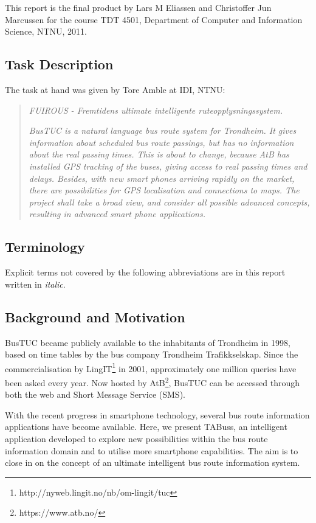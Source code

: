 This report is the final product by Lars M Eliassen and Christoffer Jun Marcussen for the course TDT 4501, Department of Computer and Information Science, NTNU, 2011.

\subsection{Task Description}
The task at hand was given by Tore Amble at IDI, NTNU:
\begin{quotation}
\begin{center}
\emph{FUIROUS - Fremtidens ultimate intelligente ruteopplysningssystem.} 
\end{center}
\vspace{10 pt}
\emph{
BusTUC is a natural language bus route system for Trondheim. It gives information about scheduled bus route passings, but has no information about the real passing times. This is about to change, because AtB has installed GPS tracking of the buses, giving access to real passing times and delays. Besides, with new smart phones arriving rapidly on the market, there are possibilities for GPS localisation and connections to maps. The project shall take a broad view, and consider all possible advanced concepts, resulting in advanced smart phone applications.}
\end{quotation}
\vspace{10 pt}

\subsection{Terminology}
Explicit terms not covered by the following abbreviations are in this report written in \emph{italic}.
	
\subsection{Background and Motivation}
BusTUC\cite{busstuc} became publicly available to the inhabitants of Trondheim in 1998, based on time tables by the bus company Trondheim Trafikkselskap. Since the commercialisation by LingIT\footnote{http://nyweb.lingit.no/nb/om-lingit/tuc} in 2001, approximately one million queries have been asked every year. Now hosted by AtB\footnote{https://www.atb.no/}, BusTUC can be accessed through both the web and Short Message Service (SMS). 

With the recent progress in smartphone technology, several bus route information applications have become available. Here, we present TABuss, an intelligent application developed to explore new possibilities within the bus route information domain and to utilise more smartphone capabilities. The aim is to close in on the concept of an ultimate intelligent bus route information system.

